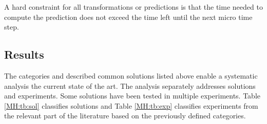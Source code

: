 \documentclass[a4paper]{atseminar}
\begin{document}
A hard constraint for all transformations or predictions is that the time needed to compute the prediction does not exceed the time left until the next micro time step.



\subsection{Results}
\label{MH:sec:results}

The categories and described common solutions listed above enable a systematic analysis the current state of the art. The analysis separately addresses solutions and experiments. Some solutions have been tested in multiple experiments. Table \ref{MH:tb:sol} classifies solutions and Table \ref{MH:tb:exp} classifies experiments from the relevant part of the literature based on the previously defined categories. 

\newcommand{\citevillas}{stevic2017europe, monti2018}
\end{document}
